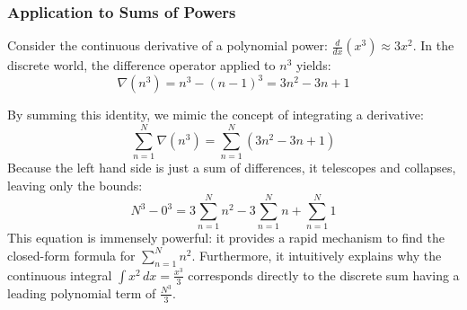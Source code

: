 \subsubsection*{Application to Sums of Powers}
Consider the continuous derivative of a polynomial power: $\frac{d}{dx}(x^3) \approx 3x^2$. 
In the discrete world, the difference operator applied to $n^3$ yields:
\[ \nabla(n^3)=n^3 - (n-1)^3 = 3n^2 - 3n + 1 \]

By summing this identity, we mimic the concept of integrating a derivative:
\[ \sum_{n=1}^N \nabla(n^3) = \sum_{n=1}^N (3n^2 - 3n + 1) \]
Because the left hand side is just a sum of differences, it telescopes and collapses, leaving only the bounds:
\[ N^3 - 0^3 = 3\sum_{n=1}^N n^2 - 3\sum_{n=1}^N n + \sum_{n=1}^N 1 \]
This equation is immensely powerful: it provides a rapid mechanism to find the closed-form formula for $\sum_{n=1}^N n^2$. Furthermore, it intuitively explains why the continuous integral $\int x^2 \, dx = \frac{x^3}{3}$ corresponds directly to the discrete sum having a leading polynomial term of $\frac{N^3}{3}$.
